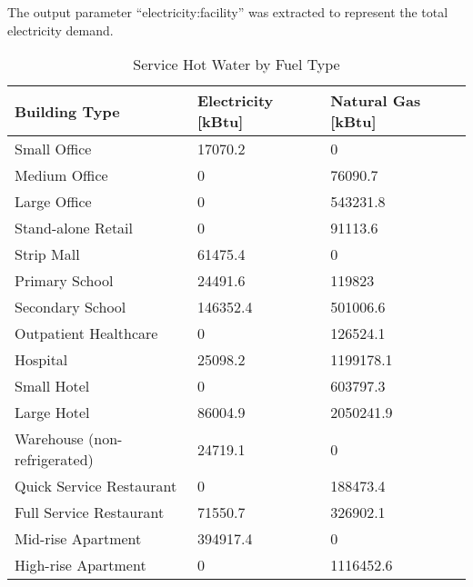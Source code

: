 The output parameter ``electricity:facility'' was extracted to
represent the total electricity demand.

\begin{table}[h!]
\centering
\caption{Service Hot Water by Fuel Type}
\label{tab:hotWater}
\begin{tabular}{l|l|l}
  \hline
Building Type                & Electricity {[}kBtu{]} & Natural Gas {[}kBtu{]} \\
  \hline
  \hline
Small Office                 & 17070.2                & 0                      \\
Medium Office                & 0                      & 76090.7                \\
Large Office                 & 0                      & 543231.8               \\
Stand-alone Retail           & 0                      & 91113.6                \\
Strip Mall                   & 61475.4                & 0                      \\
Primary School               & 24491.6                & 119823                 \\
Secondary School             & 146352.4               & 501006.6               \\
Outpatient Healthcare        & 0                      & 126524.1               \\
Hospital                     & 25098.2                & 1199178.1              \\
Small Hotel                  & 0                      & 603797.3               \\
Large Hotel                  & 86004.9                & 2050241.9              \\
Warehouse (non-refrigerated) & 24719.1                & 0                      \\
Quick Service Restaurant     & 0                      & 188473.4               \\
Full Service Restaurant      & 71550.7                & 326902.1               \\
Mid-rise Apartment           & 394917.4               & 0                      \\
High-rise Apartment          & 0                      & 1116452.6              \\
  \hline
\end{tabular}
\end{table}

\pagebreak
